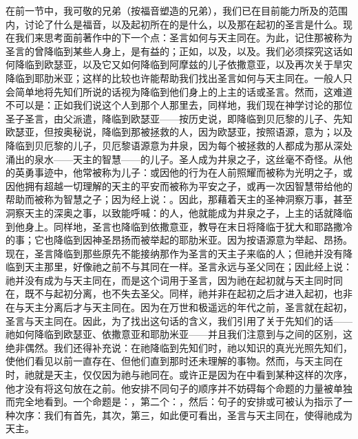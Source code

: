 在前一节中，我可敬的兄弟（按福音塑造的兄弟），我们已在目前能力所及的范围内，讨论了什么是福音，以及起初所在的是什么，以及那在起初的圣言是什么。现在我们来思考面前著作中的下一个点：圣言如何与天主同在。为此，记住那被称为圣言的曾降临到某些人身上，是有益的；正如，以及，以及。我们必须探究这话如何降临到欧瑟亚，以及它又如何降临到阿摩兹的儿子依撒意亚，以及再次关于旱灾降临到耶肋米亚；这样的比较也许能帮助我们找出圣言如何与天主同在。一般人只会简单地将先知们所说的话视为降临到他们身上的上主的话或圣言。然而，这难道不可以是：正如我们说这个人到那个人那里去，同样地，我们现在神学讨论的那位圣子圣言，由父派遣，降临到欧瑟亚——按历史说，即降临到贝厄黎的儿子、先知欧瑟亚，但按奥秘说，降临到那被拯救的人，因为欧瑟亚，按照语源，意为；以及降临到贝厄黎的儿子，贝厄黎语源意为井泉，因为每个被拯救的人都成为那从深处涌出的泉水——天主的智慧——的儿子。圣人成为井泉之子，这丝毫不奇怪。从他的英勇事迹中，他常被称为儿子：或因他的行为在人前照耀而被称为光明之子，或因他拥有超越一切理解的天主的平安而被称为平安之子，或再一次因智慧带给他的帮助而被称为智慧之子；因为经上说：。因此，那藉着天主的圣神洞察万事，甚至洞察天主的深奥之事，以致能呼喊：的人，他就能成为井泉之子，上主的话就降临到他身上。同样地，圣言也降临到依撒意亚，教导在末日将降临于犹大和耶路撒冷的事；它也降临到因神圣昂扬而被举起的耶肋米亚。因为按语源意为举起、昂扬。现在，圣言降临到那些原先不能接纳那作为圣言的天主子来临的人；但祂并没有降临到天主那里，好像祂之前不与其同在一样。圣言永远与圣父同在；因此经上说：祂并没有成为与天主同在，而是这个词用于圣言，因为祂在起初就与天主同时同在，既不与起初分离，也不失去圣父。同样，祂并非在起初之后才进入起初，也非在与天主分离后才与天主同在。因为在万世和极遥远的年代之前，圣言就在起初，圣言与天主同在。因此，为了找出这句话的含义，我们引用了关于先知们的话——祂如何降临到欧瑟亚、依撒意亚和耶肋米亚——并且我们注意到与之间的区别，这绝非偶然。我们还得补充说：在祂降临到先知们时，祂以知识的真光光照先知们，使他们看见以前一直存在、但他们直到那时还未理解的事物。然而，与天主同在时，祂就是天主，仅仅因为祂与祂同在。或许正是因为在中看到某种这样的次序，他才没有将这句放在之前。他安排不同句子的顺序并不妨碍每个命题的力量被单独而完全地看到。一个命题是：，第二个：，然后：句子的安排或可被认为指示了一种次序：我们有首先，其次，第三，如此便可看出，圣言与天主同在，使得祂成为天主。\par

